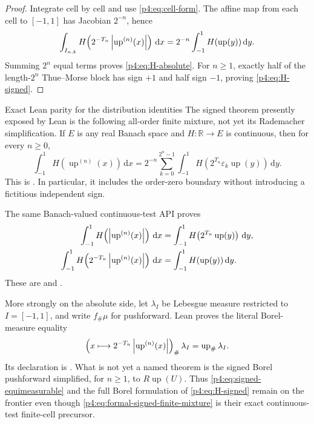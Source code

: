 \documentclass[11pt,oneside]{article}
\theoremstyle{definition}
\theoremstyle{remark}
\newcommand{\R}{\mathbb R}
\newcommand{\Up}{\operatorname{up}}
\newcommand{\dd}{\,\mathrm d}
\begin{document}
\begin{proof}
Integrate cell by cell and use \eqref{p4:eq:cell-form}.  The affine map from each cell to
$[-1,1]$ has Jacobian $2^{-n}$, hence
\[
 \int_{I_{n,k}}H\!\left(2^{-T_n}\abs{\Up^{(n)}(x)}\right)\dd x
 =2^{-n}\int_{-1}^{1}H(\Up(y))\dd y.
\]
Summing $2^n$ equal terms proves \eqref{p4:eq:H-absolute}.  For $n\geq1$, exactly half of the
length-$2^n$ Thue--Morse block has sign $+1$ and half sign $-1$, proving
\eqref{p4:eq:H-signed}.
\end{proof}

\begin{statusbox}{Exact Lean parity for the distribution identities}
The signed theorem presently exposed by Lean is the following all-order finite mixture,
not yet its Rademacher simplification.  If \(E\) is any real Banach space and
\(H:\R\to E\) is continuous, then for every \(n\ge0\),
\begin{equation}
 \int_{-1}^{1}H\!\left(\Up^{(n)}(x)\right)\dd x
 =
 2^{-n}\sum_{k=0}^{2^n-1}
 \int_{-1}^{1}H\!\left(2^{T_n}\varepsilon_k\Up(y)\right)\dd y.
 \label{p4:eq:formal-signed-finite-mixture}
\end{equation}
This is .  In particular, it includes the
order-zero boundary without introducing a fictitious independent sign.

The same Banach-valued continuous-test API proves
\begin{align}
 \int_{-1}^{1}H\!\left(\abs{\Up^{(n)}(x)}\right)\dd x
 &=
 \int_{-1}^{1}H\!\left(2^{T_n}\Up(y)\right)\dd y,
 \label{p4:eq:formal-absolute-test}\\
 \int_{-1}^{1}H\!\left(2^{-T_n}\abs{\Up^{(n)}(x)}\right)\dd x
 &=
 \int_{-1}^{1}H(\Up(y))\dd y.
 \label{p4:eq:formal-normalized-absolute-test}
\end{align}
These are  and
.

More strongly on the absolute side, let
\(\lambda_I\) be Lebesgue measure restricted to \(I=[-1,1]\), and write
\(f_{\#}\mu\) for pushforward.  Lean proves the literal Borel-measure equality
\begin{equation}
 \left(x\longmapsto2^{-T_n}\abs{\Up^{(n)}(x)}\right)_{\#}\lambda_I
 =\Up_{\#}\lambda_I.                                      \label{p4:eq:formal-absolute-pushforward}
\end{equation}
Its declaration is
.  What is not yet a named
theorem is the signed Borel pushforward simplified, for \(n\ge1\), to
\(R\Up(U)\).  Thus \eqref{p4:eq:signed-equimeasurable} and the full Borel formulation of
\eqref{p4:eq:H-signed} remain on the frontier even though
\eqref{p4:eq:formal-signed-finite-mixture} is their exact continuous-test finite-cell
precursor.
\end{statusbox}
\end{document}
